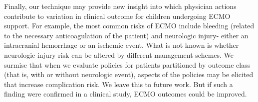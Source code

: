 \documentclass[letterpaper]{article} %
\begin{document}
Finally, our technique may provide new insight into which physician actions contribute to variation in clinical outcome for children undergoing ECMO support. For example, the most common risks of ECMO include bleeding (related to the necessary anticoagulation of the patient) and neurologic injury- either an intracranial hemorrhage or an ischemic event. What is not known is whether neurologic injury risk can be altered by different management schemes. We surmise that when we evaluate policies for patients partitioned by outcome class (that is, with or without neurologic event), aspects of the policies may be elicited that increase complication risk. We leave this to future work. But if such a finding were confirmed in a clinical study, ECMO outcomes could be improved.





%
\end{document}
